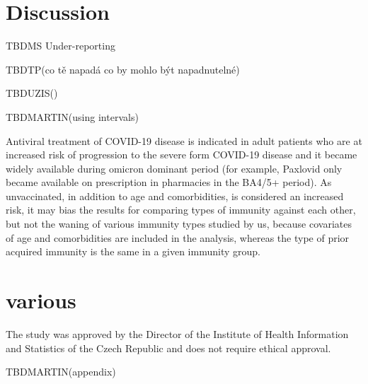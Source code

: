 \documentclass[sn-basic]{sn-jnl}%
\theoremstyle{thmstyleone}%
\theoremstyle{thmstyletwo}%
\theoremstyle{thmstylethree}%
\begin{document}



\section{Discussion}


TBDMS Under-reporting

TBDTP(co tě napadá co by mohlo být napadnutelné)

TBDUZIS() 

TBDMARTIN(using intervals)

Antiviral treatment of COVID-19 disease is indicated in adult patients who are at increased risk of progression to the severe form COVID-19 disease and it became widely available during omicron dominant period (for example, Paxlovid only became available on prescription in pharmacies in the BA4/5+ period). As unvaccinated, in addition to age and comorbidities, is considered an increased risk, it may bias the results for comparing types of immunity against each other, but not the waning of various immunity types studied by us, because covariates of age and comorbidities are included in the analysis, whereas the type of prior acquired immunity is the same in a given immunity group.

\section{various}
The study was approved by the Director of the Institute of Health Information and Statistics of the Czech Republic and does not require ethical approval.



TBDMARTIN(appendix)
\end{document}
